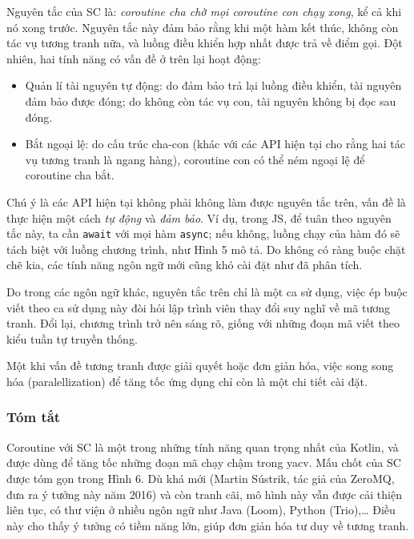 \documentclass[../../thesis]{subfiles}
\begin{document}
Nguyên tắc của SC là: \emph{coroutine cha chờ mọi coroutine con chạy xong}, kể
cả khi nó xong trước. Nguyên tắc này đảm bảo rằng khi một hàm kết thúc, không
còn tác vụ tương tranh nữa, và luồng điều khiển hợp nhất được trả về điểm gọi.
Đột nhiên, hai tính năng có vấn đề ở trên lại hoạt động:

\begin{itemize}
    \item
        Quản lí tài nguyên tự động: do đảm bảo trả lại luồng điều khiển, tài
        nguyên đảm bảo được đóng; do không còn tác vụ con, tài nguyên không bị
        đọc sau đóng.
\end{itemize}

\begin{itemize}[resume, before = \vspace*{-\dimexpr\topsep+\partopsep\relax}]
    \item
        Bắt ngoại lệ: do cấu trúc cha-con (khác với các API hiện tại cho rằng
        hai tác vụ tương tranh là ngang hàng), coroutine con có thể ném ngoại lệ
        để coroutine cha bắt.
\end{itemize}

Chú ý là các API hiện tại không phải không làm được nguyên tắc trên, vấn đề là
thực hiện một cách \emph{tự động} và \emph{đảm bảo}. Ví dụ, trong JS, để tuân
theo nguyên tắc này, ta cần \texttt{await} với mọi hàm \texttt{async}; nếu
không, luồng chạy của hàm đó sẽ tách biệt với luồng chương trình, như Hình 5 mô
tả. Do không có ràng buộc chặt chẽ kia, các tính năng ngôn ngữ mới cũng khó cài
đặt như đã phân tích.

Do trong các ngôn ngữ khác, nguyên tắc trên chỉ là một ca sử dụng, việc ép buộc
viết theo ca sử dụng này đòi hỏi lập trình viên thay đổi suy nghĩ về mã tương
tranh. Đổi lại, chương trình trở nên sáng rõ, giống với những đoạn mã viết theo
kiểu tuần tự truyền thống.

Một khi vấn đề tương tranh được giải quyết hoặc đơn giản hóa, việc song song hóa
(paralellization) để tăng tốc ứng dụng chỉ còn là một chi tiết cài đặt.

\subsubsection{Tóm tắt}

Coroutine với SC là một trong những tính năng quan trọng nhất của Kotlin, và
được dùng để tăng tốc những đoạn mã chạy chậm trong yacv. Mấu chốt của SC được
tóm gọn trong Hình 6. Dù khá mới (Martin Sústrik, tác giả của ZeroMQ, đưa ra ý
tưởng này năm 2016) và còn tranh cãi, mô hình này vẫn được cải thiện liên tục,
có thư viện ở nhiều ngôn ngữ như Java (Loom), Python (Trio),\ldots{} Điều này
cho thấy ý tưởng có tiềm năng lớn, giúp đơn giản hóa tư duy về tương tranh.
\end{document}
